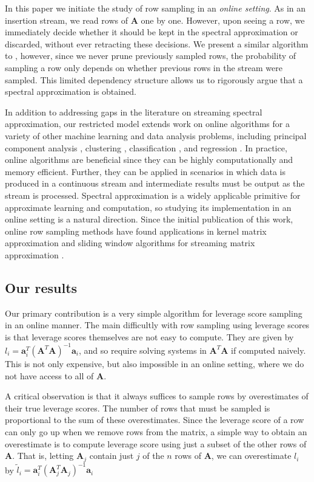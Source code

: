 \documentclass{toc}
\newcommand{\bv}[1]{\mathbf{#1}}
\begin{document}
In this paper we initiate the study of row sampling in an \emph{online setting}. As in an insertion stream, we read rows of $\bv A$ one by one. However, upon seeing a row, we immediately decide whether it should be kept in the spectral approximation or discarded, without ever retracting these decisions. 
We present a similar algorithm to \cite{kelner2013spectral}, however, since we never prune previously sampled rows, the probability of sampling a row only depends on whether previous rows in the stream were sampled. This limited dependency structure allows us to rigorously argue that a spectral approximation is obtained.

In addition to addressing gaps in the literature on streaming spectral approximation, our restricted model extends work on online algorithms for a variety of other machine learning and data analysis problems, including principal component analysis \cite{boutsidis2015online}, clustering \cite{liberty2014algorithm}, classification \cite{bordes2005huller,crammer2006online}, and regression \cite{crammer2006online}. In practice, online algorithms are beneficial since they can be highly computationally and memory efficient. Further, they can be applied in scenarios in which data is produced in a continuous stream and intermediate results must be output as the stream is processed.
Spectral approximation is a widely applicable primitive for approximate learning and computation, so studying its implementation in an online setting is a natural direction.
Since the initial publication of this work, online row sampling methods have found applications in kernel matrix approximation \cite{calandriello2017efficient,calandriello2017second} and sliding window algorithms for streaming matrix approximation \cite{braverman2018numerical}.

\subsection{Our results}

Our primary contribution is a very simple algorithm for leverage score sampling in an online manner. The main difficultly with row sampling using leverage scores is that leverage scores themselves are not easy to compute. They are given by $l_i = \bv{a}_i^T (\bv{A}^T\bv{A})^{-1} \bv{a}_i$, and so require solving systems in  $\bv{A}^T\bv{A}$ if computed naively. This is not only expensive, but also impossible in an online setting, where we do not have access to all of $\bv{A}$.

A critical observation is that
it always suffices to sample rows by overestimates of their true leverage scores. The number of rows that must be sampled is proportional to the sum of these overestimates.
Since the leverage score of a row can only go up when we remove rows from the matrix, a
simple way to obtain an overestimate is to compute leverage score using just a subset of the other rows of $\bv{A}$. That is, letting $\bv{A}_j$ contain just $j$ of the $n$ rows of $\bv{A}$, we can overestimate $l_i$ by $\tilde l_i = \bv{a}_i^T (\bv{A}_j^T\bv{A}_j)^{-1} \bv{a}_i$
 
\end{document}
